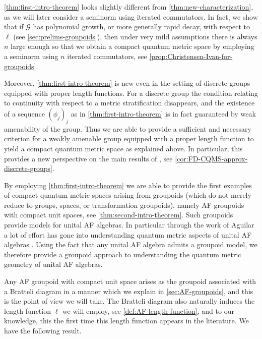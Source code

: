 \documentclass[11pt,a4paper,oneside,final,reqno]{amsart}
\theoremstyle{definition}
\newcommand{\G}{\mathcal{G}}
\numberwithin{equation}{section}
\begin{document}
	\cref{thm:first-intro-theorem} looks slightly different from \cref{thm:new-characterization}, as we will later consider a seminorm using iterated commutators. 
	In fact, we show that if $\G$ has polynomial growth, or more generally rapid decay, with respect to $\ell$ (see \cref{sec:prelims-groupoids}), then 
	under very mild assumptions
	there is  always $n$ large enough so that we obtain a compact quantum metric space by employing a seminorm using $n$ iterated commutators, see \cref{prop:Christensen-Ivan-for-groupoids}. 
	
	Moreover, \cref{thm:first-intro-theorem} is new even in the setting of discrete groups equipped with proper length functions. For a discrete group the condition relating to continuity with respect to a metric stratification disappears, and the existence of a sequence $(\phi_j)_j$ as in \cref{thm:first-intro-theorem} is in fact guaranteed by weak amenability of the group. Thus we are able to provide a sufficient and necessary criterion for a weakly amenable group equipped with a proper length function to yield a compact quantum metric space as explained above. In particular, this provides a new perspective on the main results of \cite{ChristRieffel, OzawaRieffel2004}, see \cref{cor:FD-CQMS-approx-discrete-groups}.
	
	By employing \cref{thm:first-intro-theorem} we are able to provide the first examples of compact quantum metric spaces arising from groupoids (which do not merely reduce to groups, spaces, or transformation groupoids), namely AF groupoids with compact unit spaces, see \cref{thm:second-intro-theorem}. Such groupoids provide models for unital AF algebras. In particular through the work of Aguilar a lot of effort has gone into understanding  quantum metric aspects of unital AF algebras \cite{AguilarLatremoliere2015, AguilarThesis, AguilarFelltops2019, AguilarIndLim2021}. Using the fact that any unital AF algebra admits a groupoid model, we therefore provide a groupoid approach to understanding the quantum metric geometry of unital AF algebras.
	
	Any AF groupoid with compact unit space arises as the groupoid associated with a Bratteli diagram in a manner which we explain in \cref{sec:AF-groupoids}, and this is the point of view we will take. The Bratteli diagram also naturally induces the length function $\ell$ we will employ, see \cref{def:AF-length-function}, and to our knowledge, this the first time this length function appears in the literature. 
	We have the following result. 
	
\end{document}
